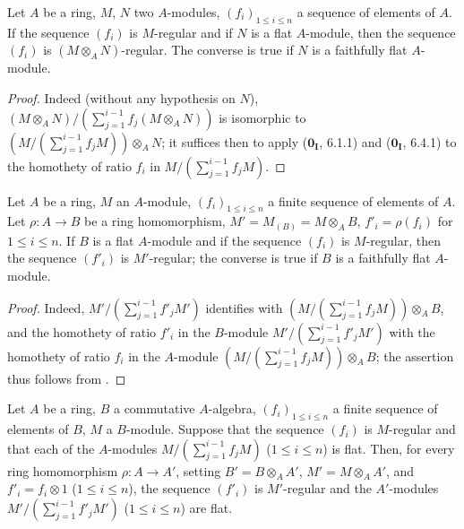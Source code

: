 \begin{proposition}[15.1.13]
\label{0.15.1.13}
Let $A$ be a ring, $M$, $N$ two $A$-modules, $(f_i)_{1\leq i\leq n}$ a sequence of elements of $A$.
If the sequence $(f_i)$ is $M$-regular and if $N$ is a flat $A$-module, then the sequence $(f_i)$ is $(M\otimes_AN)$-regular.
The converse is true if $N$ is a faithfully flat $A$-module.
\end{proposition}

\begin{proof}
Indeed (without any hypothesis on $N$), $(M\otimes_AN)/(\sum_{j=1}^{i-1}f_j(M\otimes_AN))$ is isomorphic to $(M/(\sum_{j=1}^{i-1}f_jM))\otimes_AN$;
it suffices then to apply ($\mathbf{0_I}$, 6.1.1) and ($\mathbf{0_I}$, 6.4.1) to the homothety of ratio $f_i$ in $M/(\sum_{j=1}^{i-1}f_jM)$.
\end{proof}

\begin{corollary}[15.1.14]
\label{0.15.1.14}
Let $A$ be a ring, $M$ an $A$-module, $(f_i)_{1\leq i\leq n}$ a finite sequence of elements of $A$.
Let $\rho:A\to B$ be a ring homomorphism, $M'=M_{(B)}=M\otimes_AB$, $f'_i=\rho(f_i)$ for $1\leq i\leq n$.
If $B$ is a flat $A$-module and if the sequence $(f_i)$ is $M$-regular, then the sequence $(f'_i)$ is $M'$-regular;
the converse is true if $B$ is a faithfully flat $A$-module.
\end{corollary}

\begin{proof}
Indeed, $M'/(\sum_{j=1}^{i-1}f'_jM')$ identifies with $(M/(\sum_{j=1}^{i-1}f_jM))\otimes_AB$, and the homothety of ratio $f'_i$ in the $B$-module $M'/(\sum_{j=1}^{i-1}f'_jM')$ with the homothety of ratio $f_i$ in the $A$-module $(M/(\sum_{j=1}^{i-1}f_jM))\otimes_AB$;
the assertion thus follows from .
\end{proof}

\begin{proposition}[15.1.15]
\label{0.15.1.15}
Let $A$ be a ring, $B$ a commutative $A$-algebra, $(f_i)_{1\leq i\leq n}$ a finite sequence of elements of $B$, $M$ a $B$-module.
Suppose that the sequence $(f_i)$ is $M$-regular and that each of the $A$-modules $M/(\sum_{j=1}^{i-1}f_jM)$ ($1\leq i\leq n$) is flat.
Then, for every ring homomorphism $\rho:A\to A'$, setting $B'=B\otimes_AA'$, $M'=M\otimes_AA'$, and $f'_i=f_i\otimes 1$ ($1\leq i\leq n$), the sequence $(f'_i)$ is $M'$-regular and the $A'$-modules $M'/(\sum_{j=1}^{i-1}f'_jM')$ ($1\leq i\leq n$) are flat.
\end{proposition}

